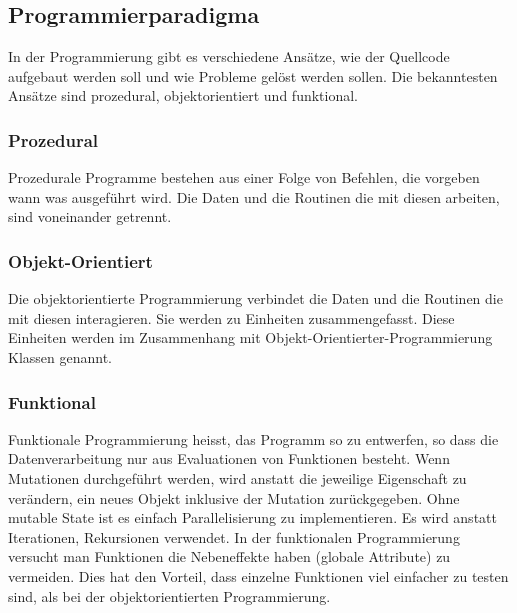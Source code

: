     \subsection{Programmierparadigma\label{sub:TechnologyParadigma}}

      In der Programmierung gibt es verschiedene Ansätze,
      wie der Quellcode aufgebaut werden soll und wie Probleme gelöst werden sollen.
      Die bekanntesten Ansätze sind prozedural, objektorientiert und funktional.

      \subsubsection{Prozedural\label{subsub:TechnologyParadigmaProzedural}}

        Prozedurale Programme bestehen aus einer Folge von Befehlen,
        die vorgeben wann was ausgeführt wird.
        Die Daten und die Routinen die mit diesen arbeiten, sind voneinander getrennt.

      \subsubsection{Objekt-Orientiert\label{subsub:TechnologyParadigmaObjectOriented}}

        Die objektorientierte Programmierung verbindet die Daten und
        die Routinen die mit diesen interagieren. Sie werden zu Einheiten zusammengefasst.
        Diese Einheiten werden im Zusammenhang mit Objekt-Orientierter-Programmierung Klassen genannt.

      \subsubsection{Funktional\label{subsub:TechnologyParadigmaFunctional}}

        Funktionale Programmierung heisst, das Programm so zu entwerfen, so dass die Datenverarbeitung nur aus Evaluationen von Funktionen besteht.
        Wenn Mutationen durchgeführt werden, wird anstatt die jeweilige Eigenschaft zu verändern,
        ein neues Objekt inklusive der Mutation zurückgegeben.
        Ohne mutable State ist es einfach Parallelisierung zu implementieren. %
        Es wird anstatt Iterationen, Rekursionen verwendet.
        In der funktionalen Programmierung versucht man Funktionen die Nebeneffekte haben (globale Attribute) zu vermeiden.
        Dies hat den Vorteil, dass einzelne Funktionen viel einfacher zu testen sind, als bei der objektorientierten Programmierung.


